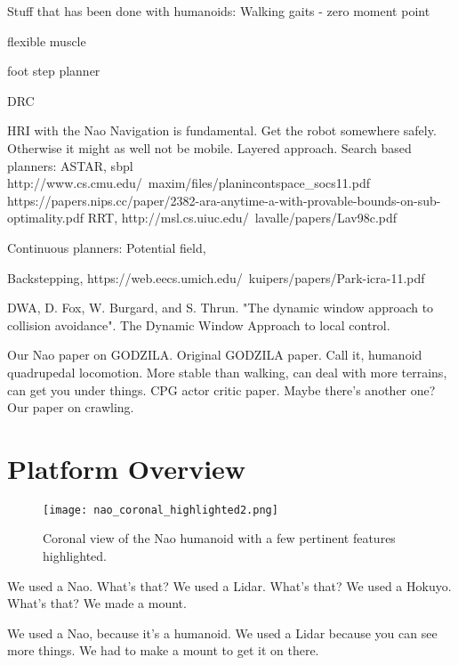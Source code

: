 Stuff that has been done with humanoids:
Walking gaits
 - zero moment point \cite{Vukobratovic1969}

 flexible muscle
 \cite{Geijtenbeek2013}

foot step planner
\cite{Deits2014}


DRC \cite{drc_website}

HRI with the Nao \cite{Ismail2012}
Navigation is fundamental. Get the robot somewhere safely. Otherwise it might
as well not be mobile.
Layered approach.
Search based planners: ASTAR, \cite{HART1986}
sbpl http://www.cs.cmu.edu/~maxim/files/planincontspace_socs11.pdf
     https://papers.nips.cc/paper/2382-ara-anytime-a-with-provable-bounds-on-sub-optimality.pdf
RRT, http://msl.cs.uiuc.edu/~lavalle/papers/Lav98c.pdf

Continuous planners: 
Potential field,

Backstepping, 
https://web.eecs.umich.edu/~kuipers/papers/Park-icra-11.pdf

DWA, 
D. Fox, W. Burgard, and S. Thrun. "The dynamic window approach to collision avoidance". The Dynamic Window Approach to local control.


Our Nao paper on GODZILA\@.
Original GODZILA paper.
Call it, humanoid quadrupedal locomotion.
More stable than walking, can deal with more terrains, can get you under things.
CPG actor critic paper. Maybe there's another one?
Our paper on crawling.

\section{Platform Overview}

\begin{figure}
	\centering
	\texttt{[image: nao\_coronal\_highlighted2.png]}
    \caption{Coronal view of the Nao humanoid with a few pertinent features 
             highlighted.}
	\label{fig:nao_diagram1}
\end{figure}

We used a Nao. What's that?
We used a Lidar. What's that? We used a Hokuyo. What's that?
We made a mount.

We used a Nao, because it's a humanoid.
We used a Lidar because you can see more things.
We had to make a mount to get it on there.


